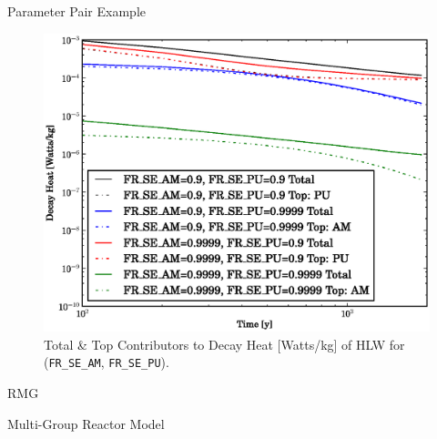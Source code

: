 \documentclass[pdf, autumn, slideColor, nocolorBG]{prosper}
\begin{document}
\begin{slide}{Parameter Pair Example}
\begin{center}
\begin{figure}
\caption{Total \& Top Contributors to Decay Heat [Watts/kg] of HLW for (\texttt{FR\_SE\_AM}, \texttt{FR\_SE\_PU}).}
\includegraphics[scale=0.375]{../ct_sensitivity/figs/FR_SE_AM_and_FR_SE_PU_Decay_Heat.eps}
\end{figure}
\end{center}
\end{slide}




%
%

\begin{slide}{RMG}
\vspace{3.5cm}
\begin{center}
\Large
Multi-Group Reactor Model
\end{center}
\end{slide}
\end{document}
